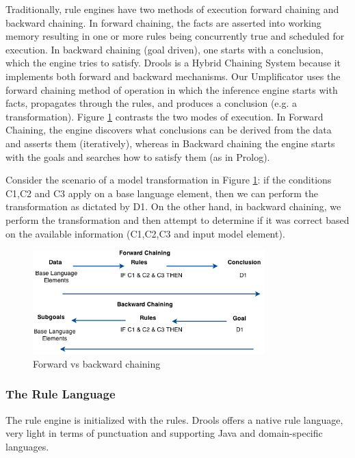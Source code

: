 Traditionally, rule engines have two methods of execution \cite{RulebasedSystems} forward chaining and backward chaining. In forward chaining, the facts are asserted into working memory resulting in one or more rules being concurrently true and scheduled for execution. In backward chaining (goal driven), one starts with a conclusion, which the engine tries to satisfy. Drools is a Hybrid Chaining System because it implements both forward and backward mechanisms. Our Umplificator uses the forward chaining method of operation in which the inference engine starts with facts, propagates through the rules, and produces a conclusion (e.g. a transformation). Figure \ref{fig:backwardForward} contrasts the two modes of execution. In Forward Chaining, the engine discovers what conclusions can be derived from the data and asserts them (iteratively), whereas in Backward chaining the engine starts with the goals and searches how to satisfy them (as in Prolog).


Consider the scenario of a model transformation in Figure \ref{fig:backwardForward}: if the conditions C1,C2 and C3 apply on a base language element, then we can perform the transformation as dictated by D1. 
On the other hand, in backward chaining, we perform the transformation and then attempt to determine if it was correct based on the available information (C1,C2,C3 and input model element).

\begin{figure}[h]
\centering
\includegraphics[width=0.80\textwidth]{Figures/ForwardBackwardChaining.png}
\caption{Forward vs backward chaining}
\label{fig:backwardForward}
\end{figure}

\subsubsection{The Rule Language}
The rule engine is initialized with the rules. Drools offers a native rule language, very light in terms of punctuation and supporting Java and domain-specific languages. 

